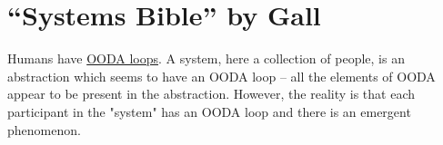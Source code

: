 \section{``Systems Bible'' by Gall\label{review:gall_bible}}

\cite{2002_Gall}


Humans have \href{https://en.wikipedia.org/wiki/OODA_loop}{OODA loops}. A system, here a collection of people, is an abstraction which seems to have an OODA loop -- all the elements of OODA appear to be present in the abstraction. However, the reality is that each participant in the "system" has an OODA loop and there is an emergent phenomenon.